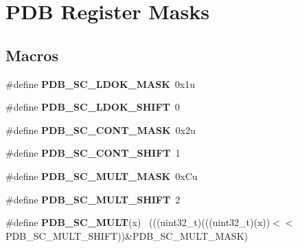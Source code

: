 \hypertarget{group___p_d_b___register___masks}{}\section{P\+D\+B Register Masks}
\label{group___p_d_b___register___masks}
\subsection*{Macros}
\begin{DoxyCompactItemize}
\item 
\hypertarget{group___p_d_b___register___masks_gabe6a0c2a0e00e0d01b3b94ca8cd90728}{}\#define {\bfseries P\+D\+B\+\_\+\+S\+C\+\_\+\+L\+D\+O\+K\+\_\+\+M\+A\+S\+K}~0x1u\label{group___p_d_b___register___masks_gabe6a0c2a0e00e0d01b3b94ca8cd90728}

\item 
\hypertarget{group___p_d_b___register___masks_ga8766bd357685d2ec463f51e0b08c6080}{}\#define {\bfseries P\+D\+B\+\_\+\+S\+C\+\_\+\+L\+D\+O\+K\+\_\+\+S\+H\+I\+F\+T}~0\label{group___p_d_b___register___masks_ga8766bd357685d2ec463f51e0b08c6080}

\item 
\hypertarget{group___p_d_b___register___masks_gaa723ee73c65ba7680ef3c9de87b8a635}{}\#define {\bfseries P\+D\+B\+\_\+\+S\+C\+\_\+\+C\+O\+N\+T\+\_\+\+M\+A\+S\+K}~0x2u\label{group___p_d_b___register___masks_gaa723ee73c65ba7680ef3c9de87b8a635}

\item 
\hypertarget{group___p_d_b___register___masks_ga49a81fd7584f9957362d71ac5f4d12bb}{}\#define {\bfseries P\+D\+B\+\_\+\+S\+C\+\_\+\+C\+O\+N\+T\+\_\+\+S\+H\+I\+F\+T}~1\label{group___p_d_b___register___masks_ga49a81fd7584f9957362d71ac5f4d12bb}

\item 
\hypertarget{group___p_d_b___register___masks_ga86e3ec0c9f5ec6d0bbc1ebcf20774b38}{}\#define {\bfseries P\+D\+B\+\_\+\+S\+C\+\_\+\+M\+U\+L\+T\+\_\+\+M\+A\+S\+K}~0x\+Cu\label{group___p_d_b___register___masks_ga86e3ec0c9f5ec6d0bbc1ebcf20774b38}

\item 
\hypertarget{group___p_d_b___register___masks_gaaf1dfea7eddb56850efd85b75d659ef8}{}\#define {\bfseries P\+D\+B\+\_\+\+S\+C\+\_\+\+M\+U\+L\+T\+\_\+\+S\+H\+I\+F\+T}~2\label{group___p_d_b___register___masks_gaaf1dfea7eddb56850efd85b75d659ef8}

\item 
\hypertarget{group___p_d_b___register___masks_ga5fe2838ee5a8eae1d02b3fc548b8a6a3}{}\#define {\bfseries P\+D\+B\+\_\+\+S\+C\+\_\+\+M\+U\+L\+T}(x)                                                  ~(((uint32\+\_\+t)(((uint32\+\_\+t)(x))$<$$<$P\+D\+B\+\_\+\+S\+C\+\_\+\+M\+U\+L\+T\+\_\+\+S\+H\+I\+F\+T))\&P\+D\+B\+\_\+\+S\+C\+\_\+\+M\+U\+L\+T\+\_\+\+M\+A\+S\+K)\label{group___p_d_b___register___masks_ga5fe2838ee5a8eae1d02b3fc548b8a6a3}


\end{DoxyCompactItemize}
